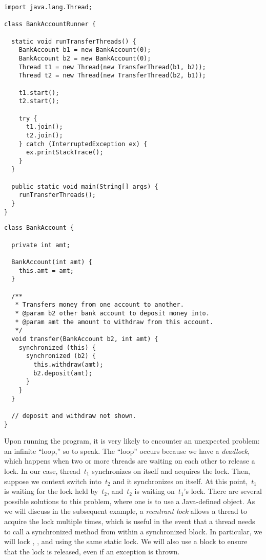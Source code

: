 \newpage
\begin{lstlisting}[language=MyJava]
import java.lang.Thread;

class BankAccountRunner {

  static void runTransferThreads() {
    BankAccount b1 = new BankAccount(0);
    BankAccount b2 = new BankAccount(0);
    Thread t1 = new Thread(new TransferThread(b1, b2));
    Thread t2 = new Thread(new TransferThread(b2, b1));

    t1.start();
    t2.start();

    try {
      t1.join();
      t2.join();
    } catch (InterruptedException ex) { 
      ex.printStackTrace(); 
    }
  }

  public static void main(String[] args) {
    runTransferThreads();
  }
}
\end{lstlisting}

\begin{lstlisting}[language=MyJava]
class BankAccount {

  private int amt;

  BankAccount(int amt) { 
    this.amt = amt; 
  }

  /**
   * Transfers money from one account to another.
   * @param b2 other bank account to deposit money into.
   * @param amt the amount to withdraw from this account.
   */
  void transfer(BankAccount b2, int amt) {
    synchronized (this) {
      synchronized (b2) {
        this.withdraw(amt);
        b2.deposit(amt);
      }
    }
  }

  // deposit and withdraw not shown.
}
\end{lstlisting}

Upon running the program, it is very likely to encounter an unexpected problem: an infinite ``loop,'' so to speak. 
The ``loop'' occurs because we have a \emph{deadlock}, which happens when two or more threads are waiting on each other to release a lock. 
In our case, thread~$t_1$ synchronizes on itself and acquires the lock. 
Then, suppose we context switch into~$t_2$ and it synchronizes on itself. 
At this point,~$t_1$ is waiting for the lock held by~$t_2$, and~$t_2$ is waiting on~$t_1$'s lock. 
There are several possible solutions to this problem, where one is to use a Java-defined  object. 
As we will discuss in the subsequent example, a \emph{reentrant lock} allows a thread to acquire the lock multiple times, which is useful in the event that a thread needs to call a synchronized method from within a synchronized block. 
In particular, we will lock , , and  using the same static lock. 
We will also use a  block to ensure that the lock is released, even if an exception is thrown.

